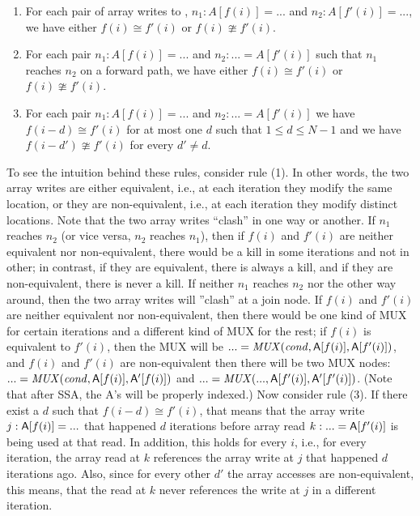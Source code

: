\documentclass[sigconf, screen, natbib=false, dvipsnames, table]{acmart}
\theoremstyle{definition}
\begin{document}
\begin{enumerate}
\item For each pair of array writes to \A, $n_1\!: A[f(i)] = ... $ and $n_2\!: A[f'(i)] = ... $, we have either $f(i) \cong f'(i)$ or 
$f(i) \ncong f'(i)$. 

\item For each pair $n_1\!: A[f(i)] = ... $ and $n_2\!: ... = A[f'(i)]$ such that $n_1$ reaches $n_2$ on a forward path, 
we have either $f(i) \cong f'(i)$ or $f(i) \ncong f'(i)$. 


\item For each pair $n_1\!: A[f(i)] = ... $ and $n_2\!: ... = A[f'(i)]$ %
we have $f(i-d) \cong f'(i)$ for at most one $d$ such that $1 \le d \le N-1$ and 
we have $f(i-d') \ncong f'(i)$ for every $d' \neq d$. 

\end{enumerate}

To see the intuition behind these rules, consider rule (1). 
In other words, the two array writes are either equivalent, i.e., at each iteration they modify the same
location, or they are non-equivalent, i.e., at each iteration they modify distinct locations. Note that the two array writes
``clash'' in one way or another. If $n_1$ reaches $n_2$ (or vice versa, $n_2$ reaches $n_1$), then if $f(i)$ and $f'(i)$ 
are neither equivalent nor non-equivalent, there would be a kill in some iterations and not in other; in contrast, if
they are equivalent, there is always a kill, and if they are non-equivalent, there is never a kill. If neither $n_1$ reaches
$n_2$ nor the other way around, then the two array writes will ''clash'' at a join node. If $f(i)$ and $f'(i)$ are neither 
equivalent nor non-equivalent, then there would be one kind of MUX for certain iterations and a different kind of MUX 
for the rest; if $f(i)$ is equivalent to $f'(i)$, then the MUX will be $... = \mathit{MUX}(\mathit{cond}, {{\sf A}}[f(i)], {{\sf A}[f'(i)]})$, and 
$f(i)$ and $f'(i)$ are non-equivalent then there will be two MUX nodes: $... = \mathit{MUX}(\mathit{cond}, {{\sf A}}[f(i)], {{\sf A}'[f(i)]})$
and $... = \mathit{MUX}(..., {{\sf A}}[f'(i)], {{\sf A}'[f'(i)]})$. (Note that after SSA, the A's will be properly indexed.)
Now consider rule (3). If there exist a $d$ such that $f(i-d) \cong f'(i)$, that means that the array write $j: {\sf A}[f(i)] = ... $ that
happened $d$ iterations before array read $k: ... = {\sf A}[f'(i)]$ is being used at that read. In addition, this holds for every $i$, 
i.e., for every iteration, the array read at $k$ references the array write at $j$ that happened $d$ iterations ago. Also,
since for every other $d'$ the array accesses are non-equivalent, this means, that the read at $k$ never references  
the write at $j$ in a different iteration.
\end{document}
